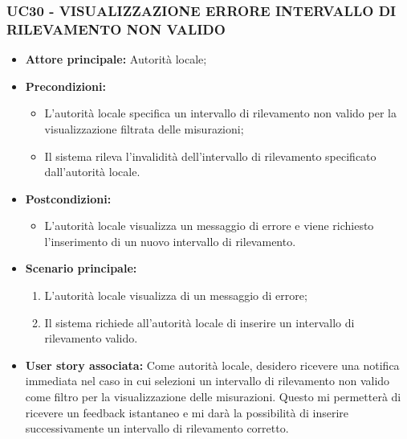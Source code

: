 \subsubsection{UC30 - VISUALIZZAZIONE ERRORE INTERVALLO DI RILEVAMENTO NON VALIDO}
\begin{itemize}
    \item \textbf{Attore principale:} Autorità locale;
    \item \textbf{Precondizioni:}
        \begin{itemize} 
            \item L'autorità locale specifica un intervallo di rilevamento non valido per la visualizzazione filtrata delle misurazioni;
            \item Il sistema rileva l'invalidità dell'intervallo di rilevamento specificato dall'autorità locale.
        \end{itemize}
    \item \textbf{Postcondizioni:}
        \begin{itemize}
            \item L'autorità locale visualizza un messaggio di errore e viene richiesto l'inserimento di un nuovo intervallo di rilevamento.
        \end{itemize}
    \item \textbf{Scenario principale:}
            \begin{enumerate}
            \item L'autorità locale visualizza di un messaggio di errore;
            \item Il sistema richiede all'autorità locale di inserire un intervallo di rilevamento valido.
            \end{enumerate}
    \item \textbf{User story associata:}
        Come autorità locale, desidero ricevere una notifica immediata nel caso in cui selezioni un intervallo di rilevamento non valido come filtro per la visualizzazione delle misurazioni. Questo mi permetterà di ricevere un feedback istantaneo e mi darà la possibilità di inserire successivamente un intervallo di rilevamento corretto.
\end{itemize}